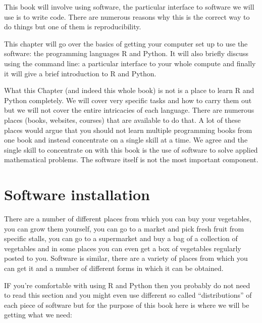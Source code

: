 This book will involve using software, the particular interface to software we
will use is to write code. There are numerous reasons why this is the correct
way to do things but one of them is reproducibility. %

This chapter will go over the basics of getting your computer set up to use the
software: the programming languages R %
and Python. %
It will also briefly discuss using the command line: a particular interface to
your whole compute and finally it will give a brief introduction to R and
Python.

What this Chapter (and indeed this whole book) is not is a place to learn R and
Python completely. We will cover very specific tasks and how to carry them out
but we will not cover the entire intricacies of each language. There are
numerous places (books, websites, courses) that are available to do that.
A lot of these places would argue that you should not learn multiple
programming books from one book and instead concentrate on a single skill at a
time. We agree and the single skill to concentrate on with this book is the use
of software to solve applied mathematical problems. The software itself is not
the most important component.

\section{Software installation}\label{sec:software-installation}

There are a number of different places from which you can buy your vegetables,
you can grow them yourself, you can go to a market and pick fresh fruit from
specific stalls, you can go to a supermarket and buy a bag of a collection of
vegetables and in some places you can even get a box of vegetables regularly
posted to you. Software is similar, there are a variety of places from which you
can get it and a number of different forms in which it can be obtained.

IF you're comfortable with using R and Python then you probably do not need to
read this section and you might even use different so called ``distributions''
of each piece of software but for the purpose of this book here is where we will
be getting what we need:


